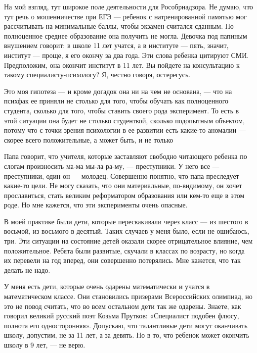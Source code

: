 На мой взгляд, тут широкое поле деятельности для Рособрнадзора. Не думаю, что тут речь о мошенничестве при ЕГЭ --- ребенок с натренированной памятью мог рассчитывать на минимальные баллы, чтобы экзамен считался сданным. Но полноценное среднее образование она получить не могла. Девочка под папиным внушением говорит: в школе 11 лет учатся, а в институте --- пять, значит, институт --- проще, я его окончу за два года. Эти слова ребенка цитируют СМИ. Предположим, она окончит институт в 11 лет. Вы пойдете на консультацию к такому специалисту-психологу? Я, честно говоря, остерегусь.

\begin{fancyquotes}
    Это моя гипотеза --- и кроме догадок она ни на чем не основана, --- что на психфак ее приняли не столько для того, чтобы обучать как полноценного студента, сколько для того, чтобы ставить своего рода эксперимент. То есть в этой ситуации она будет не столько студенткой, сколько подопытным объектом, потому что с точки зрения психологии в ее развитии есть какие-то аномалии --- скорее всего положительные, а может быть, и не только
\end{fancyquotes}

Папа говорит, что учителя, которые заставляют свободно читающего ребенка по слогам произносить ма-ма мы-ла ра-му, --- преступники. У него все --- преступники, один он --- молодец. Совершенно понятно, что папа преследует какие-то цели. Не могу сказать, что они материальные, по-видимому, он хочет прославиться, стать великим реформатором образования или кем-то еще в этом роде. Но мне кажется, что эти эксперименты очень опасные.

В моей практике были дети, которые перескакивали через класс --- из шестого в восьмой, из восьмого в десятый. Таких случаев у меня было, если не ошибаюсь, три. Эти ситуации на состояние детей оказали скорее отрицательное влияние, чем положительное. Ребята были развитые, скучали в классах по возрасту, но когда их перевели на год вперед, они совершенно потерялись. Мне кажется,  что так делать не надо.

У меня есть дети, которые очень одарены математически и учатся в математическом классе. Они становились призерами Всероссийских олимпиад, но это не повод считать, что во всем остальном дети так же одарены. Знаете, как говорил великий русский поэт Козьма Прутков: «Специалист подобен флюсу, полнота его односторонняя». Допускаю, что талантливые дети могут оканчивать школу, допустим, не за 11 лет, а за девять. Но в то, что ребенок может окончить школу в 9 лет, --- не верю.

